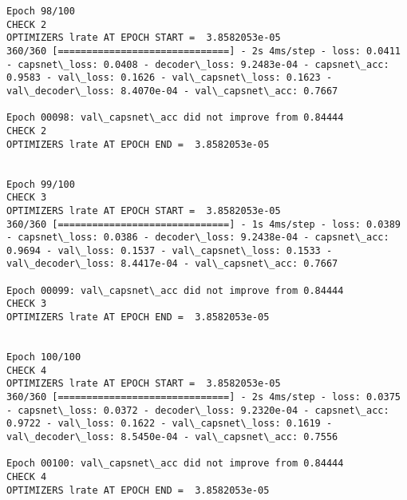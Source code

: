 \documentclass[11pt]{article}
\begin{document}
\begin{Verbatim}[commandchars=\\\{\}]
Epoch 98/100
CHECK 2
OPTIMIZERS lrate AT EPOCH START =  3.8582053e-05
360/360 [==============================] - 2s 4ms/step - loss: 0.0411 - capsnet\_loss: 0.0408 - decoder\_loss: 9.2483e-04 - capsnet\_acc: 0.9583 - val\_loss: 0.1626 - val\_capsnet\_loss: 0.1623 - val\_decoder\_loss: 8.4070e-04 - val\_capsnet\_acc: 0.7667

Epoch 00098: val\_capsnet\_acc did not improve from 0.84444
CHECK 2
OPTIMIZERS lrate AT EPOCH END =  3.8582053e-05 


Epoch 99/100
CHECK 3
OPTIMIZERS lrate AT EPOCH START =  3.8582053e-05
360/360 [==============================] - 1s 4ms/step - loss: 0.0389 - capsnet\_loss: 0.0386 - decoder\_loss: 9.2438e-04 - capsnet\_acc: 0.9694 - val\_loss: 0.1537 - val\_capsnet\_loss: 0.1533 - val\_decoder\_loss: 8.4417e-04 - val\_capsnet\_acc: 0.7667

Epoch 00099: val\_capsnet\_acc did not improve from 0.84444
CHECK 3
OPTIMIZERS lrate AT EPOCH END =  3.8582053e-05 


Epoch 100/100
CHECK 4
OPTIMIZERS lrate AT EPOCH START =  3.8582053e-05
360/360 [==============================] - 2s 4ms/step - loss: 0.0375 - capsnet\_loss: 0.0372 - decoder\_loss: 9.2320e-04 - capsnet\_acc: 0.9722 - val\_loss: 0.1622 - val\_capsnet\_loss: 0.1619 - val\_decoder\_loss: 8.5450e-04 - val\_capsnet\_acc: 0.7556

Epoch 00100: val\_capsnet\_acc did not improve from 0.84444
CHECK 4
OPTIMIZERS lrate AT EPOCH END =  3.8582053e-05 



    \end{Verbatim}
\end{document}
